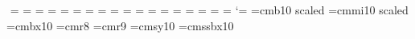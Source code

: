 $$ \dummyft@=\z@
{} \dummyft@=\z@
{} \dummyft@=\z@
{} \dummyft@=\z@
{} \dummyft@=\z@
{} \dummyft@=\z@
{} \dummyft@=\z@
{} \dummyft@=\z@
{} \dummyft@=\z@
{} \dummyft@=\z@
{} \dummyft@=\z@
{} \dummyft@=\z@
{} \dummyft@=\z@
{} \dummyft@=\z@
{} \dummyft@=\z@
{} \dummyft@=\z@
{} \dummyft@=\z@
{} \dummyft@=\z@
\def\fontlist@{\\{\tenrm}\\{\sevenrm}\\{\fiverm}\\{\teni}\\{\seveni}%
 \\{\fivei}\\{\tensy}\\{\sevensy}\\{\fivesy}\\{\tenex}\\{\tenbf}\\{\sevenbf}%
 \\{\fivebf}\\{\tensl}\\{\tenit}\\{\tensmc}}
\def\dodummy@{{\def\\##1{\global\let##1=\dummyft@}\fontlist@}}
\newif\ifsyntax@
\newcount\countxviii@
\def\newtoks@{\alloc@5\toks\toksdef\@cclvi}
\def\nopages@{\output={\setbox\z@=\box\@cclv \deadcycles=\z@}\newtoks@\output}
\def\syntax{\syntax@true\dodummy@\countxviii@=\count18
\loop \ifnum\countxviii@ > \z@ \textfont\countxviii@=\dummyft@
   \scriptfont\countxviii@=\dummyft@ \scriptscriptfont\countxviii@=\dummyft@
     \advance\countxviii@ by-\@ne\repeat
\dummyft@\tracinglostchars=\z@
  \nopages@\frenchspacing\hbadness=\@M}
\def\wlog#1{\immediate\write-1{#1}}
\catcode`\@=\active
%
%
%
%
%
\def\ln{\hbox{ln}}
\def\e{\hbox{e}}
\font\bigfonts=cmb10 scaled
\font\bigmath=cmmi10 scaled
\font\auth=cmbx10
\font\small=cmr8
\font\smallish=cmr9
\font\curly=cmsy10
\font\rep=cmssbx10



\def\rcms{randomly cross-linked macro\-mole\-cules}

